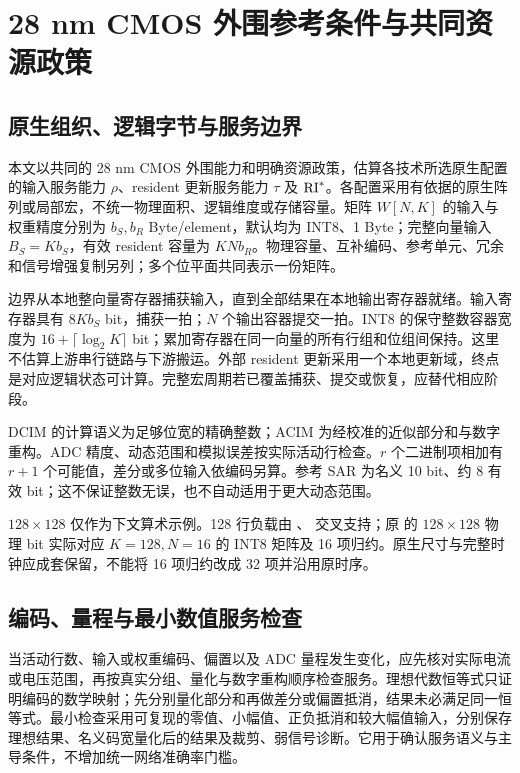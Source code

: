 \section{28 nm CMOS 外围参考条件与共同资源政策}

\subsection{原生组织、逻辑字节与服务边界}

本文以共同的 28 nm CMOS 外围能力和明确资源政策，估算各技术所选原生配置的输入服务能力 $\rho$、resident 更新服务能力 $\tau$ 及 $\mathrm{RI}^*$。各配置采用有依据的原生阵列或局部宏，不统一物理面积、逻辑维度或存储容量。矩阵 $W[N,K]$ 的输入与权重精度分别为 $b_S,b_R$ Byte/element，默认均为 INT8、1 Byte；完整向量输入 $B_S=Kb_S$，有效 resident 容量为 $KNb_R$。物理容量、互补编码、参考单元、冗余和信号增强复制另列；多个位平面共同表示一份矩阵。

边界从本地整向量寄存器捕获输入，直到全部结果在本地输出寄存器就绪。输入寄存器具有 $8Kb_S$ bit，捕获一拍；$N$ 个输出容器提交一拍。INT8 的保守整数容器宽度为 $16+\lceil\log_2K\rceil$ bit；累加寄存器在同一向量的所有行组和位组间保持。这里不估算上游串行链路与下游搬运。外部 resident 更新采用一个本地更新域，终点是对应逻辑状态可计算。完整宏周期若已覆盖捕获、提交或恢复，应替代相应阶段。

DCIM 的计算语义为足够位宽的精确整数；ACIM 为经校准的近似部分和与数字重构。ADC 精度、动态范围和模拟误差按实际活动行检查。$r$ 个二进制项相加有 $r+1$ 个可能值，差分或多位输入依编码另算。参考 SAR 为名义 10 bit、约 8 有效 bit；这不保证整数无误，也不自动适用于更大动态范围。

$128\times128$ 仅作为下文算术示例。128 行负载由 、 交叉支持；原  的 $128\times128$ 物理 bit 实际对应 $K=128,N=16$ 的 INT8 矩阵及 16 项归约。原生尺寸与完整时钟应成套保留，不能将 16 项归约改成 32 项并沿用原时序。\cite{CMOS-03,SACIM-03,SDCIM-01}

\subsection{编码、量程与最小数值服务检查}

当活动行数、输入或权重编码、偏置以及 ADC 量程发生变化，应先核对实际电流或电压范围，再按真实分组、量化与数字重构顺序检查服务。理想代数恒等式只证明编码的数学映射；先分别量化部分和再做差分或偏置抵消，结果未必满足同一恒等式。最小检查采用可复现的零值、小幅值、正负抵消和较大幅值输入，分别保存理想结果、名义码宽量化后的结果及裁剪、弱信号诊断。它用于确认服务语义与主导条件，不增加统一网络准确率门槛。

